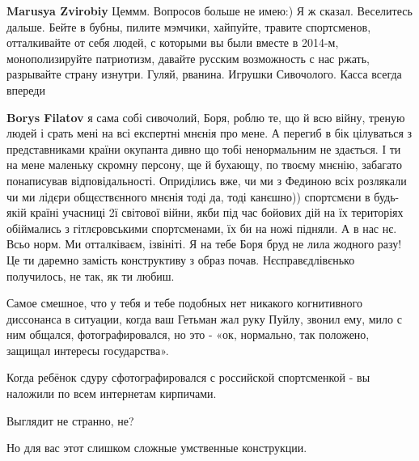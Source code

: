 \begin{itemize}
\begin{itemize}
\textbf{Marusya Zvirobiy} Цеммм.
Вопросов больше не имею:)
Я ж сказал. Веселитесь дальше.
Бейте в бубны, пилите мэмчики, хайпуйте, травите спортсменов, отталкивайте от себя людей, с которыми вы были вместе в 2014-м, монополизируйте патриотизм, давайте русским возможность с нас ржать, разрывайте страну изнутри.
Гуляй, рванина.
Игрушки Сивочолого.
Касса всегда впереди

 

\textbf{Borys Filatov} я сама собі сивочолий, Боря, роблю те, що й всю війну,
треную людей і срать мені на всі експертні мнєнія про мене. А перегиб в бік
цілуваться з представниками країни окупанта дивно що тобі ненормальним не
здається. І ти на мене маленьку скромну персону, ще й бухающу, по твоєму
мнєнію, забагато понаписував відповідальності. Оприділись вже, чи ми з Фединою
всіх розлякали чи ми лідєри общєствєнного мнєнія тоді да, тоді канєшно))
спортсмєни в будь-якій країні учасниці 2ї світової війни, якби під час бойових
дій на їх територіях обіймались з гітлєровськими спортсменами, їх би на ножі
підняли. А в нас нє. Всьо норм. Ми отталківаєм, ізвініті. Я на тебе Боря бруд
не лила жодного разу! Це ти даремно замість конструктиву з образ почав.
Нєсправєдлівєнько получилось, не так, як ти любиш.


 

Самое смешное, что у тебя и тебе подобных нет никакого когнитивного диссонанса
в ситуации, когда ваш Гетьман жал руку Пуйлу, звонил ему, мило с ним общался,
фотографировался, но это - «ок, нормально, так положено, защищал интересы
государства».

Когда ребёнок сдуру сфотографировался с российской спортсменкой - вы наложили
по всем интернетам кирпичами.

Выглядит не странно, не?

Но для вас этот слишком сложные умственные конструкции.


 


\end{itemize}
\end{itemize}
